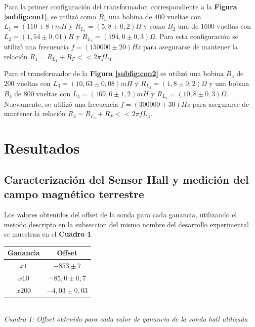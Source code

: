 \documentclass[11pt,a4paper]{article}
\begin{document}
Para la primer configuración del transformador, correspondiente a la \textbf{Figura \ref{subfig:con1}}, se utilizó como $B_1$ una bobina de 400 vueltas con $L_1 = (110 \pm 8)mH$ y $R_{L_1} = (5,8 \pm 0,2)\Omega$ y como $B_2$ una de 1600 vueltas con $L_2 = (1,54 \pm 0,01)H$ y $R_{L_2} = (194,0 \pm 0,3)\Omega$. Para esta configuración se utilizó una frecuencia $f = (150000 \pm 20)Hz$ para asegurarse de mantener la relación $R_1 = R_{L_1}+R_F << 2\pi fL_1$.

Para el transformador de la \textbf{Figura \ref{subfig:con2}} se utilizó una bobina $B_3$ de 200 vueltas con $L_3 = (10,63 \pm 0,08)mH$ y $R_{L_3} = (1,8 \pm 0,2)\Omega$ y una bobina $B_4$ de 800 vueltas con $L_4 = (169,6 \pm 1,2)mH$ y $R_{L_4} = (10,8 \pm 0,3)\Omega$. Nuevamente,  se utilizó una frecuencia $f = (300000 \pm 30)Hz$ para asegurarse de mantener la relación $R_3 = R_{L_3}+R_F << 2\pi fL_3$.




\section{Resultados}
\label{sec:discusion}

\subsection{Caracterización del Sensor Hall y medición del campo magnético terrestre}

Los valores obtenidos del offset de la sonda para cada ganancia, utilizando el metodo descripto en la subseccion del mismo nombre del desarrollo experimental se muestran en el \textbf{Cuadro 1}


\bigskip
\begin{minipage}{\linewidth}
\centering
\begin{tabular}{||c|c||}
\hline 
\label{tab:offset}
\textbf{Ganancia} & \textbf{Offset} \\ \hline 
$x1$ & $-853 \pm 7$  \\ \hline 
$x10$ & $-85,0 \pm 0,7$  \\ \hline 
$x200$ & $-4,03 \pm 0,03$  \\ \hline 
\end{tabular}\\[0.3cm]

\textit{Cuadro 1: Offset obtenido para cada valor de ganancia de la sonda hall utilizada}
\end{minipage}
\bigskip
\end{document}
